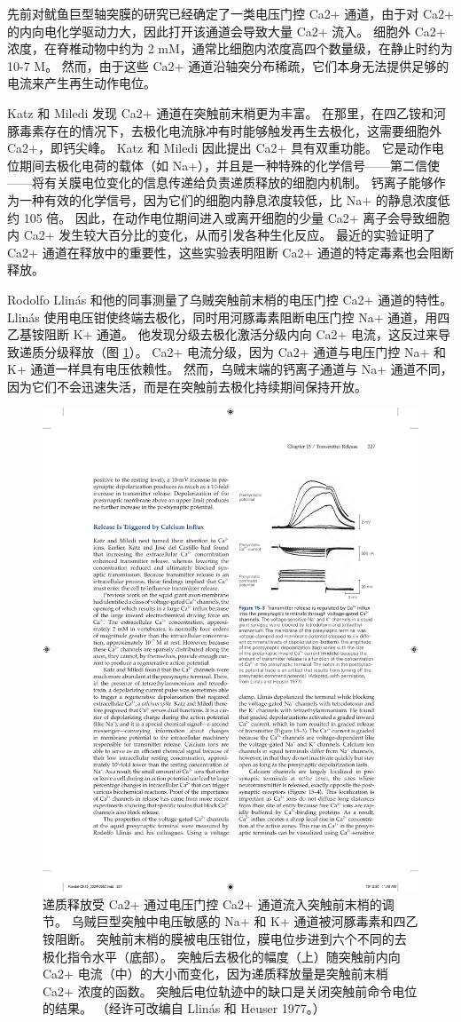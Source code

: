 先前对鱿鱼巨型轴突膜的研究已经确定了一类电压门控 Ca2+ 通道，由于对 Ca2+ 的内向电化学驱动力大，因此打开该通道会导致大量 Ca2+ 流入。 
细胞外 Ca2+ 浓度，在脊椎动物中约为 2 mM，通常比细胞内浓度高四个数量级，在静止时约为 10-7 M。
然而，由于这些 Ca2+ 通道沿轴突分布稀疏，它们本身无法提供足够的电流来产生再生动作电位。


Katz 和 Miledi 发现 Ca2+ 通道在突触前末梢更为丰富。
在那里，在四乙铵和河豚毒素存在的情况下，去极化电流脉冲有时能够触发再生去极化，这需要细胞外 Ca2+，即钙尖峰。
Katz 和 Miledi 因此提出 Ca2+ 具有双重功能。 它是动作电位期间去极化电荷的载体（如 Na+），并且是一种特殊的化学信号——第二信使——将有关膜电位变化的信息传递给负责递质释放的细胞内机制。 
钙离子能够作为一种有效的化学信号，因为它们的细胞内静息浓度较低，比 Na+ 的静息浓度低约 105 倍。 
因此，在动作电位期间进入或离开细胞的少量 Ca2+ 离子会导致细胞内 Ca2+ 发生较大百分比的变化，从而引发各种生化反应。 
最近的实验证明了 Ca2+ 通道在释放中的重要性，这些实验表明阻断 Ca2+ 通道的特定毒素也会阻断释放。


Rodolfo Llinás 和他的同事测量了乌贼突触前末梢的电压门控 Ca2+ 通道的特性。 
Llinás 使用电压钳使终端去极化，同时用河豚毒素阻断电压门控 Na+ 通道，用四乙基铵阻断 K+ 通道。 
他发现分级去极化激活分级内向 Ca2+ 电流，这反过来导致递质分级释放（图 \ref{fig:15_3}）。 
Ca2+ 电流分级，因为 Ca2+ 通道与电压门控 Na+ 和 K+ 通道一样具有电压依赖性。 
然而，乌贼末端的钙离子通道与 Na+ 通道不同，因为它们不会迅速失活，而是在突触前去极化持续期间保持开放。

\begin{figure}[htbp]
	\centering
	\includegraphics[width=0.5\linewidth]{chap15/fig_15_3}
	\caption{递质释放受 Ca2+ 通过电压门控 Ca2+ 通道流入突触前末梢的调节。 乌贼巨型突触中电压敏感的 Na+ 和 K+ 通道被河豚毒素和四乙铵阻断。 突触前末梢的膜被电压钳位，膜电位步进到六个不同的去极化指令水平（底部）。 突触后去极化的幅度（上）随突触前内向 Ca2+ 电流（中）的大小而变化，因为递质释放量是突触前末梢 Ca2+ 浓度的函数。 突触后电位轨迹中的缺口是关闭突触前命令电位的结果。 （经许可改编自 Llinás 和 Heuser 1977。）}
	\label{fig:15_3}
\end{figure}


